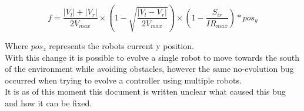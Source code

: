 \begin{equation}
f = \frac{|V_l| + |V_r|}{2V_{max}} \times ( 1 - \sqrt{\frac{|V_l - V_r|}{2V_{max}}}) \times (1 - \frac{S_{ir}}{IR_{max}}) * pos_y
\end{equation}

Where $pos_z$ represents the robots current y position. \\
With this change it is possible to evolve a single robot to move towards the south of the environment while avoiding obstacles, however the same no-evolution bug occurred when trying to evolve a controller using multiple robots.\\
It is as of this moment this document is written unclear what caused this bug and how it can be fixed.  